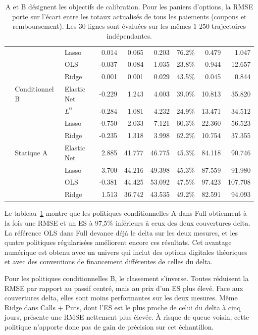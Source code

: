 \documentclass[12pt,a4paper]{article}
\newcommand{\1}{\mathbf{1}}
\begin{document}
\begin{table}[H]
{\begin{tabular}{lllrrrrrr}
 &  & Lasso & 0.014 & 0.065 & 0.203 & 76.2\% & 0.479 & 1.047 \\
 &  & OLS & -0.037 & 0.084 & 1.035 & 23.8\% & 0.944 & 12.657 \\
 &  & Ridge & 0.001 & 0.001 & 0.029 & 43.5\% & 0.045 & 0.844 \\
\addlinespace[2pt]
 & Conditionnel B & Elastic Net & -0.229 & 1.243 & 4.003 & 39.0\% & 10.813 & 35.820 \\
 &  & $L^0$ & -0.284 & 1.081 & 4.232 & 24.9\% & 13.471 & 34.512 \\
 &  & Lasso & -0.750 & 2.033 & 7.121 & 60.3\% & 22.360 & 56.523 \\
 &  & Ridge & -0.235 & 1.318 & 3.998 & 62.2\% & 10.754 & 37.355 \\
\addlinespace[2pt]
 & Statique A & Elastic Net & 2.885 & 41.777 & 46.775 & 45.3\% & 84.118 & 90.746 \\
 &  & Lasso & 3.700 & 44.216 & 49.398 & 45.3\% & 87.559 & 91.980 \\
 &  & OLS & -0.381 & 44.425 & 53.092 & 47.5\% & 97.423 & 107.708 \\
 &  & Ridge & 1.513 & 36.742 & 43.535 & 49.2\% & 82.591 & 94.093 \\
\bottomrule
\end{tabular}}
\caption{A et B désignent les objectifs de calibration. Pour les paniers d’options, la RMSE porte sur l’écart entre les totaux actualisés de tous les paiements (coupons et remboursement). Les 30 lignes sont évaluées sur les mêmes 1 250 trajectoires indépendantes.}
\label{tab:unified-comparison}
\end{table}

Le tableau~\ref{tab:unified-comparison} montre que les politiques conditionnelles A dans Full obtiennent à la fois une RMSE et un ES à 97,5\% inférieurs à ceux des deux couvertures delta. La référence OLS dans Full devance déjà le delta sur les deux mesures, et les quatre politiques régularisées améliorent encore ces résultats. Cet avantage numérique est obtenu avec un univers qui inclut des options digitales théoriques et avec des conventions de financement différentes de celles du delta.

Pour les politiques conditionnelles B, le classement s’inverse. Toutes réduisent la RMSE par rapport au passif centré, mais au prix d’un ES plus élevé. Face aux couvertures delta, elles sont moins performantes sur les deux mesures. Même Ridge dans Calls + Puts, dont l’ES est le plus proche de celui du delta à cinq jours, présente une RMSE nettement plus élevée. À risque de queue voisin, cette politique n’apporte donc pas de gain de précision sur cet échantillon.
\end{document}
